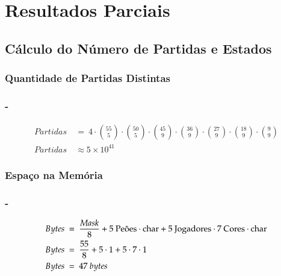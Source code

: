 \section{Resultados Parciais}

\subsection{Cálculo do Número de Partidas e Estados}
\subsubsection{Quantidade de Partidas Distintas}
\begin{frame}[fragile]
	\frametitle{\subsecname - \subsubsecname}
\begin{equation*}
\begin{split}
	Partidas\ &=\  4\cdot \binom{55}{5} \cdot \binom{50}{5} \cdot \binom{45}{9} \cdot \binom{36}{9} \cdot \binom{27}{9} \cdot \binom{18}{9} \cdot \binom{9}{9}\\
	Partidas\ &\approx 5\times 10^{41}
\end{split}
\end{equation*}
\end{frame}

\subsubsection{Espaço na Memória}
\begin{frame}[fragile]
	\frametitle{\subsecname - \subsubsecname}
\begin{equation*}
\begin{split}
	Bytes\ &=\ \dfrac{\text{\emph{Mask}}}{8} + 5\text{ Peões}\cdot\text{char} + 5\text{ Jogadores}\cdot 7\text{ Cores}\cdot\text{char}\\
	Bytes\ &=\ \dfrac{55}{8} + 5\cdot1 + 5\cdot7\cdot1\\
	Bytes\ &=\ 47\ bytes
\end{split}
\end{equation*}
\end{frame}

